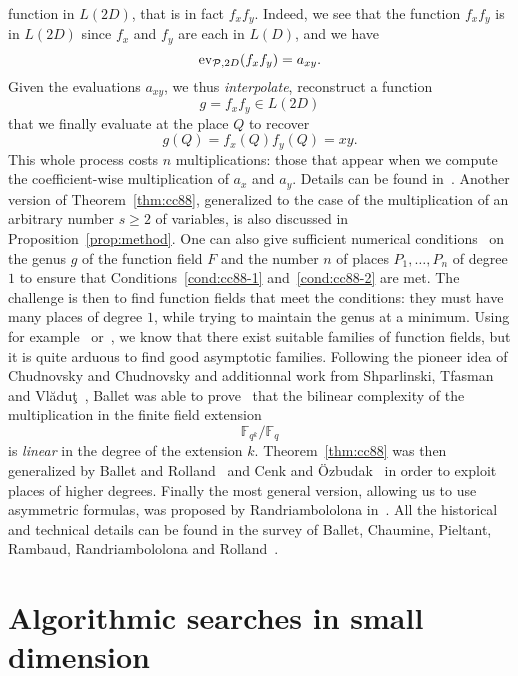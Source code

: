 function in $L(2D)$, that is in fact $f_xf_y$. Indeed, we see that the function
$f_xf_y$ is in $L(2D)$ since $f_x$ and $f_y$ are each in $L(D)$, and we have
\[
  \operatorname{ev}_{\mathcal{P}, 2D}(f_xf_y) = a_{xy}.
\]
Given the evaluations $a_{xy}$, we thus \emph{interpolate}, \ie reconstruct a
function
\[
  g = f_xf_y\in L(2D)
\]
that we finally evaluate at the place $Q$ to recover
\[
  g(Q) = f_x(Q)f_y(Q) = xy.
\]
This whole process costs $n$ multiplications: those that appear when we compute
the coefficient-wise multiplication of $a_x$ and $a_y$.
Details can be found in~\cite{CC88}. Another version of Theorem~\ref{thm:cc88},
generalized to the case of the multiplication of an arbitrary number $s\geq2$ of
variables, is also discussed in Proposition~\ref{prop:method}. One can also give
sufficient numerical conditions~\cite{Ballet98, Ballet99} on the genus $g$ of
the function field $F$ and the number
$n$ of places $P_1, \dots, P_n$ of degree $1$ to ensure that
Conditions~\ref{cond:cc88-1} and~\ref{cond:cc88-2} are met.
The challenge is
then to find function fields that meet the conditions: they must have many
places of degree $1$, while trying to maintain the genus at a minimum.
Using for example~\cite{STV92} or~\cite{Pieltant12}, we know that there exist
suitable families of function fields, but it is quite arduous to find good
asymptotic families. Following the pioneer idea of Chudnovsky and Chudnovsky and
additionnal work from Shparlinski, Tfasman and
Vlăduţ~\cite{STV92}, Ballet was able to prove~\cite{Ballet99} that the bilinear
complexity of the multiplication in the finite field extension
\[
  \mathbb{F}_{q^k}/\mathbb{F}_q
\]
is \emph{linear} in the degree of the extension $k$. Theorem~\ref{thm:cc88} was
then generalized by Ballet and Rolland~\cite{BR04} and Cenk and
Özbudak~\cite{CO10} in order to exploit places of higher degrees.
Finally the most general version, allowing us to use asymmetric
formulas, was proposed by Randriambololona in~\cite{Randriam12}.
All the historical and technical details can be found in the survey of Ballet,
Chaumine, Pieltant, Rambaud, Randriambololona and Rolland~\cite{BCPRRR21}.

\section{Algorithmic searches in small dimension}
\label{sec:algorithmic-searches}

%

